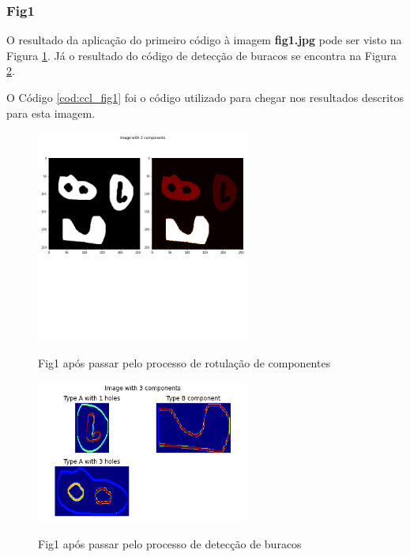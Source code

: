 \documentclass{article}
\begin{document}
\subsubsection{Fig1}
O resultado da aplicação do primeiro código à imagem \textbf{fig1.jpg} pode ser visto na Figura \ref{fig: ccl_fig1}. Já o resultado do código de detecção de buracos se encontra na Figura \ref{fig: hole_fig1}. 

O Código \ref{cod:ccl_fig1} foi o código utilizado para chegar nos resultados descritos para esta imagem. 

\begin{figure}[!ht]
	\begin{minipage}[b]{1.0\linewidth}
		\centering
		\centerline{\includegraphics[width=7cm]{Figures/fig1.png}}
		\label{fig: ccl_fig1}
		\vspace{-2.0cm}
		\centerline{Fig1 após passar pelo processo de rotulação de componentes}\medskip	
	\end{minipage}
\end{figure}

\begin{figure}[!ht]
	\begin{minipage}[b]{1.0\linewidth}
		\centering
		\centerline{\includegraphics[width=7cm]{Figures/ccl_fig1.png}}
		\label{fig: hole_fig1}
		\centerline{Fig1 após passar pelo processo de detecção de buracos}\medskip	
	\end{minipage}
\end{figure}
\end{document}

